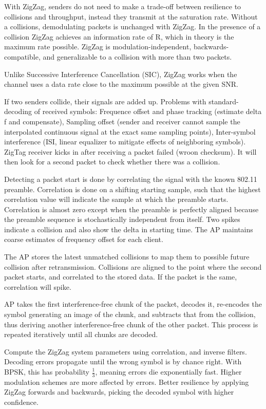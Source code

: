 With ZigZag, senders do not need to make a trade-off between resilience to collisions and throughput, instead they transmit at the saturation rate. Without a collisions, demodulating packets is unchanged with ZigZag. In the presence of a collision ZigZag achieves an information rate of R, which in theory is the maximum rate possible. ZigZag is modulation-independent, backwards-compatible, and generalizable to a collision with more than two packets.

Unlike Successive Interference Cancellation (SIC), ZigZag works when the channel uses a data rate close to the maximum possible at the given SNR.

If two senders collide, their signals are added up. Problems with standard-decoding of received symbols: Frequence offset and phase tracking (estimate delta f and compensate), Sampling offset (sender and receiver cannot sample the interpolated continuous signal at the exact same sampling points), Inter-symbol interference (ISI, linear equalizer to mitigate effects of neighboring symbols). ZigTag receiver kicks in after receiving a packet failed (wroon checksum).  It will then look for a second packet to check whether there was a collision.

Detecting a packet start is done by correlating the signal with the known 802.11 preamble. Correlation is done on a shifting starting sample, such that the highest correlation value will indicate the sample at which the preamble starts. Correlation is almost zero except when the preamble is perfectly aligned because the preamble sequence is stochastically independent from itself. Two spikes indicate a collision and also show the delta in starting time. The AP maintains coarse estimates of frequency offset for each client.

The AP stores the latest unmatched collisions to map them to possible future collision after retransmission. Collisions are aligned to the point where the second packet starts, and correlated to the stored data. If the packet is the same, correlation will spike.

AP takes the first interference-free chunk of the packet, decodes it, re-encodes the symbol generating an image of the chunk, and subtracts that from the collision, thus deriving another interference-free chunk of the other packet. This process is repeated iteratively until all chunks are decoded.

Compute the ZigZag system parameters using correlation, and inverse filters. Decoding errors propagate until the wrong symbol is by chance right. With BPSK, this has probability $\frac{1}{3}$, meaning errors die exponentially fast. Higher modulation schemes are more affected by errors. Better resilience by applying ZigZag forwards and backwards, picking the decoded symbol with higher confidence.

